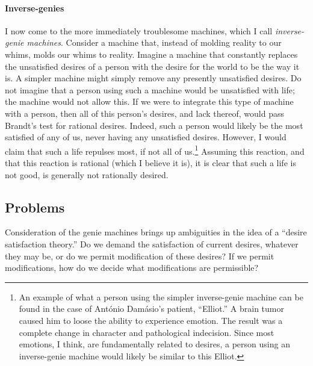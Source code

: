 \documentclass[letterpaper,11pt,twoside]{article}
\begin{document}
      \paragraph{Inverse-genies}
        I now come to the more immediately troublesome machines, which I call \emph{inverse-genie machines}.  Consider a machine that, instead of molding reality to our whims, molds our whims to reality.  Imagine a machine that constantly replaces the unsatisfied desires of a person with the desire for the world to be the way it is.  A simpler machine might simply remove any presently unsatisfied desires.  Do not imagine that a person using such a machine would be unsatisfied with life; the machine would not allow this.  If we were to integrate this type of machine with a person, then all of this person's desires, and lack thereof, would pass Brandt's test for rational desires.  Indeed, such a person would likely be the most satisfied of any of us, never having any unsatisfied desires.  However, I would claim that such a life repulses most, if not all of us.\footnote{An example of what a person using the simpler inverse-genie machine can be found in the case of Ant\'onio Dam\'asio's patient, ``Elliot.''\footnotemark{}  A brain tumor caused him to loose the ability to experience emotion.  The result was a complete change in character and pathological indecision.  Since most emotions, I think, are fundamentally related to desires, a person using an inverse-genie machine would likely be similar to this Elliot.}  Assuming this reaction, and that this reaction is rational (which I believe it is), it is clear that such a life is not good, is generally not rationally desired.
  \subsection*{Problems}
    Consideration of the genie machines brings up ambiguities in the idea of a ``desire satisfaction theory.''  Do we demand the satisfaction of current desires, whatever they may be, or do we permit modification of these desires?  If we permit modifications, how do we decide what modifications are permissible?
\end{document}
